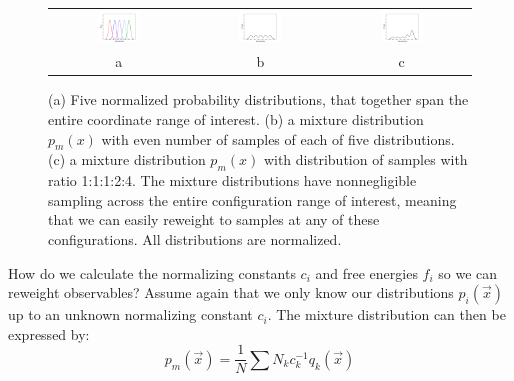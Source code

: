 \documentclass[aps,pre,twocolumn,superscriptaddress]{revtex4-1}
\begin{document}
\begin{figure}
\begin{tabular}{ccc}
\includegraphics[width=0.33\textwidth]{constN_numf4}&
\includegraphics[width=0.33\textwidth]{constN_mix.pdf}&
\includegraphics[width=0.33\textwidth]{varN_mix.pdf} \\
a & b & c
\end{tabular}
\caption{(a) Five normalized probability distributions, that together
  span the entire coordinate range of interest. (b) a mixture
  distribution $p_m(x)$ with even number of samples of each of five
  distributions. (c) a mixture distribution $p_m(x)$ with distribution
  of samples with ratio 1:1:1:2:4. The mixture distributions have
  nonnegligible sampling across the entire configuration range of
  interest, meaning that we can easily reweight to samples at any of
  these configurations. All distributions are normalized.}
\label{figure:mixture}
\end{figure}

How do we calculate the normalizing constants $c_i$ and free energies
$f_i$ so we can reweight observables? Assume again that we only know
our distributions $p_i(\vec{x})$ up to an unknown normalizing constant
$c_i$. The mixture distribution can then be expressed by:
\[ p_m(\vec{x}) = \frac{1}{N}\sum N_k c_k^{-1} q_k(\vec{x}) \]
\end{document}
